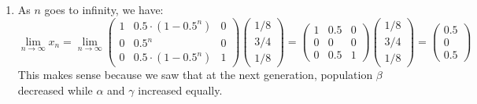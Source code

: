 \documentclass[11pt, legalpaper]{article}
\begin{document}
\begin{enumerate}
    \item As $n$ goes to infinity, we have:
    $$\lim_{n\to \infty}x_n=\lim_{n\to \infty}\begin{pmatrix}
        1 & 0.5\cdot(1-0.5^n) & 0 \\
        0 & 0.5^n & 0 \\
        0 & 0.5\cdot(1-0.5^n) & 1
    \end{pmatrix}\begin{pmatrix} 1/8 \\ 3/4 \\ 1/8 \end{pmatrix}=\begin{pmatrix} 1 & 0.5 & 0 \\
        0 & 0& 0 \\
        0 & 0.5 & 1\end{pmatrix}\begin{pmatrix} 1/8 \\ 3/4 \\ 1/8 \end{pmatrix}=\begin{pmatrix} 0.5 \\ 0 \\ 0.5 \end{pmatrix}$$
    This makes sense because we saw that at the next generation, population $\beta$ decreased while $\alpha$ and $\gamma$ increased equally.
    

\end{enumerate}
\end{document}
